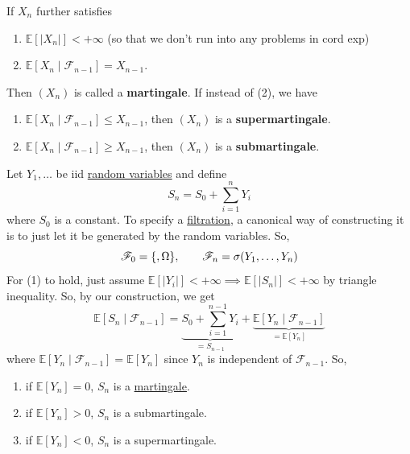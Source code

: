 	\begin{definition}[Martingale]
	  \label{def:martingale}
	  If $X_n$ further satisfies 
		\begin{enumerate}
			\item $\mathbb{E}[|X_n|] < +\infty$ (so that we don't run into any problems in cord exp)
			\item $\mathbb{E}[X_n \mid \mathscr{F}_{n-1}] = X_{n-1}$. 
		\end{enumerate}
		Then $(X_n)$ is called a \textbf{martingale}. If instead of (2), we have 
		\begin{enumerate}
		  \item $\mathbb{E}[X_n \mid \mathscr{F}_{n-1}] \leq X_{n-1}$, then $(X_n)$ is a \textbf{supermartingale}. 
		  \item $\mathbb{E}[X_n \mid \mathscr{F}_{n-1}] \geq X_{n-1}$, then $(X_n)$ is a \textbf{submartingale}. 
		\end{enumerate}
	\end{definition}

	\begin{example}
	  \label{ex:random-walk}
	  Let $Y_1, \ldots$ be iid \hyperref[def:random-variable]{random variables} and define 
		\begin{equation}
			S_n = S_0 + \sum_{i=1}^n Y_i
		\end{equation}
		where $S_0$ is a constant. To specify a \hyperref[def:filtration-2]{filtration}, a canonical way of constructing it is to just let it be generated by the random variables. So, 
		\begin{equation}
			\mathscr{F}_0 = \{\empty,  \Omega\}, \qquad \mathscr{F}_n = \sigma(Y_1, \ldots, Y_n)
		\end{equation}
		For (1) to hold, just assume $\mathbb{E}[|Y_i|] < +\infty \implies \mathbb{E}[|S_n|] < +\infty$ by triangle inequality. So, by our construction, we get 
		\begin{equation}
			\mathbb{E}[S_n \mid \mathscr{F}_{n-1}] = \underbrace{S_0 + \sum_{i=1}^{n-1} Y_i}_{= S_{n-1}} + \underbrace{\mathbb{E}[Y_n \mid \mathscr{F}_{n-1}]}_{= \mathbb{E}[Y_n]} 
		\end{equation}
		where $\mathbb{E}[Y_n \mid \mathscr{F}_{n-1}] = \mathbb{E}[Y_n]$ since $Y_n$ is independent of $\mathscr{F}_{n-1}$. So, 
		\begin{enumerate}
			\item if $\mathbb{E}[Y_n] = 0$, $S_n$ is a \hyperref[def:martingale]{martingale}. 
			\item if $\mathbb{E}[Y_n] > 0$, $S_n$ is a submartingale. 
			\item if $\mathbb{E}[Y_n] < 0$, $S_n$ is a supermartingale. 
		\end{enumerate}
	\end{example}

